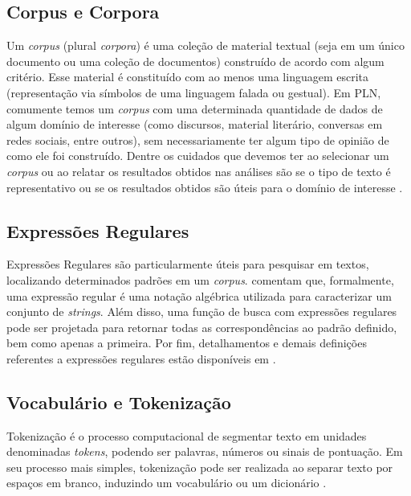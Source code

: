 \documentclass{automatextcc}
\begin{document}
\subsection{Corpus e Corpora}
Um \textit{corpus} (plural \textit{corpora}) é uma coleção de material textual (seja em um único documento ou uma coleção de documentos) construído de acordo com algum critério. Esse material é constituído com ao menos uma linguagem escrita (representação via símbolos de uma linguagem falada ou gestual). Em PLN, comumente temos um \textit{corpus} com uma determinada quantidade de dados de algum domínio de interesse (como discursos, material literário, conversas em redes sociais, entre outros), sem necessariamente ter algum tipo de opinião de como ele foi construído. Dentre os cuidados que devemos ter ao selecionar um \textit{corpus} ou ao relatar os resultados obtidos nas análises são se o tipo de texto é representativo ou se os resultados obtidos são úteis para o domínio de interesse \citep{manning1999, kamath2019}.



\subsection{Expressões Regulares}
Expressões Regulares são particularmente úteis para pesquisar em textos, localizando determinados padrões em um \textit{corpus}. \citet{jurafsky2021} comentam que, formalmente, uma expressão regular é uma notação algébrica utilizada para caracterizar um conjunto de \textit{strings}. Além disso, uma função de busca com expressões regulares pode ser projetada para retornar todas as correspondências ao padrão definido, bem como apenas a primeira. Por fim, detalhamentos e demais definições referentes a expressões regulares estão disponíveis em \citet{jurafsky2021}.



\subsection{Vocabulário e Tokenização}
Tokenização é o processo computacional de segmentar texto em unidades denominadas \textit{tokens}, podendo ser palavras, números ou sinais de pontuação. Em seu processo mais simples, tokenização pode ser realizada ao separar texto por espaços em branco, induzindo um vocabulário ou um dicionário \citep{kamath2019, jurafsky2021}.
\end{document}
